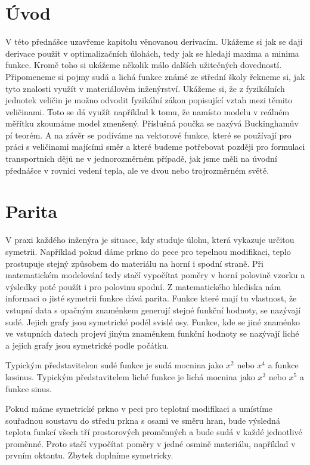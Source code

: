 \documentclass[12pt]{article}
\begin{document}
\section*{Úvod}

V této přednášce uzavřeme kapitolu věnovanou derivacím. Ukážeme si jak se dají derivace použit v optimalizačních úlohách, tedy jak se hledají maxima a minima funkce. Kromě toho si ukážeme několik málo dalších užitečných dovedností. Připomeneme si pojmy sudá a lichá funkce známé ze střední školy řekneme si, jak tyto znalosti využít v materiálovém inženýrství. Ukážeme si, že z fyzikálních jednotek veličin je možno odvodit fyzikální zákon popisující vztah mezi těmito veličinami. Toto se dá využít například k tomu, že namísto modelu v reálném měřítku zkoumáme model zmenšený. Příslušná poučka se nazývá Buckinghamův pí teorém. A na závěr se podíváme na vektorové funkce, které se používají pro práci s veličinami majícími směr a které budeme potřebovat později pro formulaci transportních dějů ne v jednorozměrném případě, jak jsme měli na úvodní přednášce v rovnici vedení tepla, ale ve dvou nebo trojrozměrném světě. 

\section*{Parita}

V praxi každého inženýra je situace, kdy studuje úlohu, která vykazuje určitou symetrii. Například pokud dáme prkno do pece pro tepelnou modifikaci, teplo prostupuje stejný způsobem do materiálu na horní i spodní straně. Při matematickém modelování tedy stačí vypočítat poměry v horní polovině vzorku a výsledky poté použít i pro polovinu spodní. Z matematického hlediska nám informaci o jisté symetrii funkce dává parita. Funkce které mají tu vlastnost, že vstupní data s opačným znaménkem generují stejné funkční hodnoty, se nazývají sudé. Jejich grafy jsou symetrické podél svislé osy. Funkce, kde se jiné znaménko ve vstupních datech projeví jiným znaménkem funkční hodnoty se nazývají liché a jejich grafy jsou symetrické podle počátku.

Typickým představitelem sudé funkce je sudá mocnina jako $x^2$ nebo $x^4$ a funkce kosinus. Typickým představitelem liché funkce je lichá mocnina jako $x^3$ nebo $x^5$ a funkce sinus.

Pokud máme symetrické prkno v peci pro teplotní modifikaci a umístíme souřadnou soustavu do středu prkna s osami ve směru hran, bude výsledná teplota funkcí všech tří prostorových proměnných a bude sudá v každé jednotlivé proměnné. Proto stačí vypočítat poměry v jedné osmině materiálu, například v prvním oktantu. Zbytek doplníme symetricky.
\end{document}
